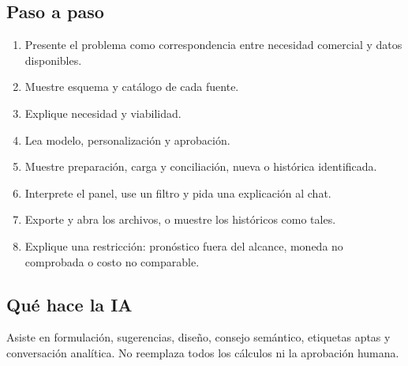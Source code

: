 \subsection{Paso a paso}
\begin{enumerate}
\item Presente el problema como correspondencia entre necesidad comercial y datos disponibles.\par\nopagebreak[4]
\item Muestre esquema y catálogo de cada fuente.\par\nopagebreak[4]
\item Explique necesidad y viabilidad.\par\nopagebreak[4]
\item Lea modelo, personalización y aprobación.\par\nopagebreak[4]
\item Muestre preparación, carga y conciliación, nueva o histórica identificada.\par\nopagebreak[4]
\item Interprete el panel, use un filtro y pida una explicación al chat.\par\nopagebreak[4]
\item Exporte y abra los archivos, o muestre los históricos como tales.\par\nopagebreak[4]
\item Explique una restricción: pronóstico fuera del alcance, moneda no comprobada o costo no comparable.\par\nopagebreak[4]
\end{enumerate}
\subsection{Qué hace la IA}
Asiste en formulación, sugerencias, diseño, consejo semántico, etiquetas aptas y conversación analítica. No reemplaza todos los cálculos ni la aprobación humana.

